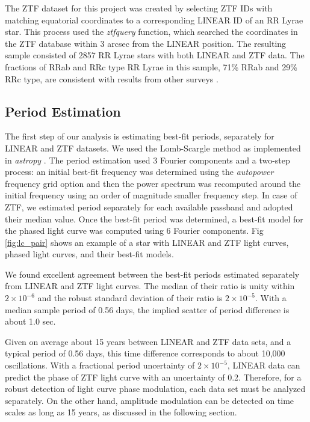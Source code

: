 The ZTF dataset for this project was created by selecting ZTF IDs with matching equatorial coordinates to a corresponding
LINEAR ID of an RR Lyrae star. This process used the {\it ztfquery} function, which searched the coordinates in the ZTF database
within 3 arcsec from the LINEAR position. The resulting sample consisted of 2857 RR Lyrae stars with both LINEAR and ZTF data.
The fractions of RRab and RRc type RR Lyrae in this sample, 71\% RRab and 29\% RRc type, are consistent with results from
other surveys \citep[e.g.,][]{2010ApJ...708..717S}. 


\subsection{Period Estimation}


The first step of our analysis is estimating best-fit periods, separately for LINEAR and ZTF datasets. 
We used the Lomb-Scargle method \citep{2015zndo.....14833V} as implemented in {\it astropy}
\citep{2018AJ....156..123A}. The period estimation used 3 Fourier components and a two-step process: an initial
best-fit frequency was determined using the {\it autopower} frequency grid option and then the power spectrum was
recomputed around the initial frequency using an order of magnitude smaller frequency step. In case of ZTF, we
estimated period separately for each available passband and adopted their median value. Once the best-fit
period was determined, a best-fit model for the phased light curve was computed using 6 Fourier components.
Fig \ref{fig:lc_pair} shows an example of a star with LINEAR and ZTF light curves, phased light curves, and their
best-fit models.  

We found excellent agreement between the best-fit periods estimated separately from LINEAR and ZTF light curves. 
The median of their ratio is unity within $2\times10^{-6}$ and the robust standard deviation of their ratio is
$2\times10^{-5}$. With a median sample period of 0.56 days, the implied scatter of period difference is about 1.0 sec.  

Given on average about 15 years between LINEAR and ZTF data sets, and a typical period of 0.56 days, this time
difference corresponds to about 10,000 oscillations. With a fractional period uncertainty of $2\times10^{-5}$,
LINEAR data can predict the phase of ZTF light curve with an uncertainty of 0.2. Therefore, for a robust detection
of light curve phase modulation, each data set must be analyzed separately. On the other hand, amplitude
modulation can be detected on time scales as long as 15 years, as discussed in the following section. 



